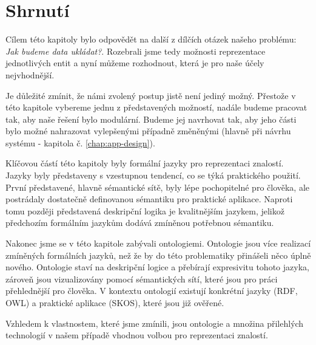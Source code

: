 


\section{Shrnutí}
Cílem této kapitoly bylo odpovědět na další z dílčích otázek našeho problému: \textit{Jak budeme data ukládat?}. Rozebrali jsme tedy možnosti reprezentace jednotlivých entit a nyní můžeme rozhodnout, která je pro naše účely nejvhodnější.\par 
Je důležité zmínit, že námi zvolený postup jistě není jediný možný. Přestože v této kapitole vybereme jednu z představených možností, nadále budeme pracovat tak, aby naše řešení bylo modulární. Budeme jej navrhovat tak, aby jeho části bylo možné nahrazovat vylepšenými případně změněnými (hlavně při návrhu systému - kapitola č. \ref{chap:app-design}).\par
Klíčovou částí této kapitoly byly formální jazyky pro reprezentaci znalostí. Jazyky byly představeny s vzestupnou tendencí, co se týká praktického použití. První představené, hlavně sémantické sítě, byly lépe pochopitelné pro člověka, ale postrádaly dostatečně definovanou sémantiku pro praktické aplikace. Naproti tomu později představená deskripční logika je kvalitnějším jazykem, jelikož předchozím formálním jazykům dodává zmíněnou potřebnou sémantiku.\par
Nakonec jsme se v této kapitole zabývali ontologiemi. Ontologie jsou více realizací zmíněných formálních jazyků, než že by do této problematiky přinášeli něco úplně nového. Ontologie staví na deskripční logice a přebírají expresivitu tohoto jazyka, zároveň jsou vizualizovány pomocí sémantických sítí, které jsou pro práci přehlednější pro člověka. V kontextu ontologií existují konkrétní jazyky (RDF, OWL) a praktické aplikace (SKOS), které jsou již ověřené.\par
Vzhledem k vlastnostem, které jsme zmínili, jsou ontologie a množina přilehlých technologií v našem případě vhodnou volbou pro reprezentaci znalostí.\par



